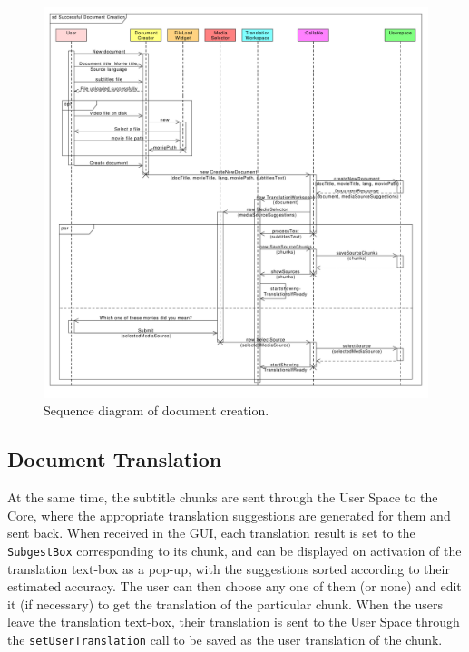 \begin{figure}[h]
\begin{center}
\includegraphics[scale=0.40]{figures/document_creation_sequence_GUI.pdf}
\end{center}
\caption{Sequence diagram of document creation.}\label{gui:sd:document_creation}
\end{figure}

\subsection{Document Translation}
\label{sec:document_translation}

At the same time, the subtitle chunks are sent through the User Space to the Core, where the appropriate translation suggestions are generated for them and sent back. When received in the GUI, each translation result is set to the {\tt SubgestBox} corresponding to its chunk, and can be displayed on activation of the translation text-box as a pop-up, with the suggestions sorted according to their estimated accuracy.
The user can then choose any one of them (or none) and edit it (if necessary) to get the translation of the particular chunk. When the users leave the translation text-box, their translation is sent to the User Space through the {\tt setUserTranslation} call to be saved as the user translation of the chunk.

